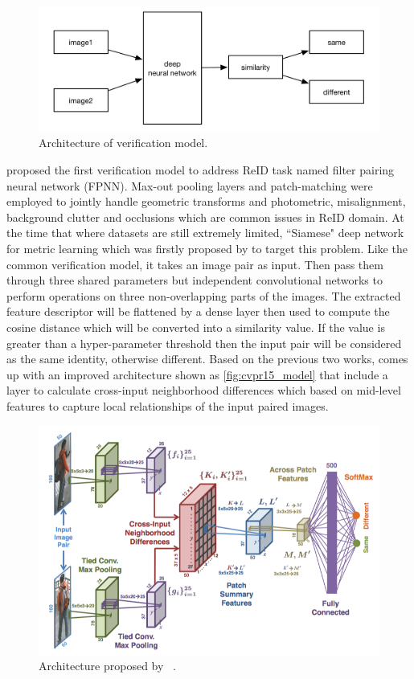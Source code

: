 \begin{figure}
    \includegraphics[width=\linewidth]{figures/verification_model.png}
    \caption{Architecture of verification model.}
    \label{fig:vft_model}
\end{figure}

\cite{first-pairwise-net-for-reid-2014} proposed the first verification model to address ReID task named filter pairing
neural network (FPNN). Max-out pooling layers and patch-matching were employed to jointly handle geometric
transforms and photometric, misalignment, background clutter and occlusions which are common issues in ReID domain.
At the time that where datasets are still extremely limited, ``Siamese" deep network for metric learning which was firstly
proposed by \cite{first-siamese-net-for-reid-2014} to target this problem. Like the common verification model, it takes an
image pair as input. Then pass them through three shared parameters but independent convolutional networks to perform operations
on three non-overlapping parts of the images. The extracted feature descriptor will be flattened by a dense layer then used to
compute the cosine distance which will be converted into a similarity value. If the value is greater than a hyper-parameter
threshold then the input pair will be considered as the same identity, otherwise different. Based on the previous two works,
\cite{an-improved-dl-archit-2015} comes up with an improved architecture shown as \autoref{fig:cvpr15_model} that include a layer to
calculate cross-input neighborhood differences which based on mid-level features to capture local relationships of the input
paired images.

\begin{figure}
    \includegraphics[width=\linewidth]{figures/cvpr15_model.png}
    \caption{Architecture proposed by ~\protect \cite{an-improved-dl-archit-2015}.}
    \label{fig:cvpr15_model}
\end{figure}

